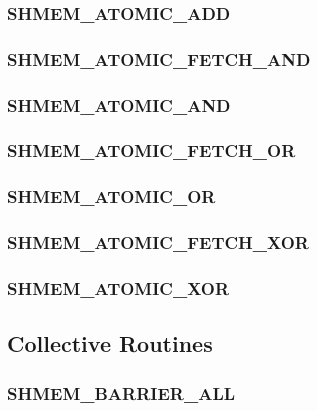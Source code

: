 \documentclass[10pt]{book}
\begin{document}
\subsubsection{\textbf{SHMEM\_ATOMIC\_ADD}}\label{subsec:shmem_add}


\subsubsection{\textbf{SHMEM\_ATOMIC\_FETCH\_AND}}\label{subsec:shmem_fand}


\subsubsection{\textbf{SHMEM\_ATOMIC\_AND}}\label{subsec:shmem_and}


\subsubsection{\textbf{SHMEM\_ATOMIC\_FETCH\_OR}}\label{subsec:shmem_for}


\subsubsection{\textbf{SHMEM\_ATOMIC\_OR}}\label{subsec:shmem_or}


\subsubsection{\textbf{SHMEM\_ATOMIC\_FETCH\_XOR}}\label{subsec:shmem_fxor}


\subsubsection{\textbf{SHMEM\_ATOMIC\_XOR}}\label{subsec:shmem_xor}






\subsection{Collective Routines}\label{subsec:coll}


\subsubsection{\textbf{SHMEM\_BARRIER\_ALL}}\label{subsec:shmem_barrier_all}

\end{document}
